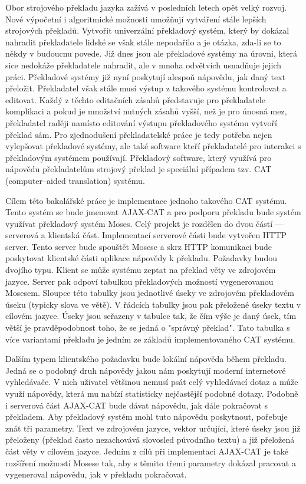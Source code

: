 \documentclass[12pt,a4paper]{report}
\begin{document}
Obor strojového překladu jazyka zažívá v posledních letech opět velký rozvoj. Nové výpočetní i algoritmické možnosti umožňují vytváření stále lepších strojových překladů. Vytvořit univerzální překladový systém, který by dokázal nahradit překladatele lidské se však stále nepodařilo a je otázka, zda-li se to někdy v budoucnu povede. Již dnes jsou ale překladové systémy na úrovni, která sice nedokáže překladatele nahradit, ale v mnoha odvětvích usnadňuje jejich práci. Překladové systémy již nyní poskytují alespoň nápovědu, jak daný text přeložit. Překladatel však stále musí výstup z takového systému kontrolovat a editovat. Každý z těchto editačních zásahů představuje pro překladatele komplikaci a pokud je množství nutných zásahů vyšší, než je pro únosná mez, překladatel raději namísto editování výstupu překladového systému vytvoří překlad sám. Pro zjednodušení překladatelské práce je tedy potřeba nejen vylepšovat překladové systémy, ale také software kteří překladatelé pro interakci s překladovým systémem používají. Překladový software, který využívá pro nápovědu překladatelům strojový překlad je speciální případem tzv. CAT (computer--aided translation) systému.

Cílem této bakalářské práce je implementace jednoho takového CAT systému. Tento systém se bude jmenovat AJAX-CAT a pro podporu překladu bude systém využívat překladový systém Moses. Celý projekt je rozdělen do dvou částí --- serverová a klientská část. Implementací serverové části bude vytvořen HTTP server. Tento server bude spouštět Mosese a skrz HTTP komunikaci bude poskytovat klientské části aplikace nápovědy k překladu. Požadavky budou dvojího typu. Klient se může systému zeptat na překlad věty ve zdrojovém jazyce. Server pak odpoví tabulkou překladových možností vygenerovanou Mosesem. Sloupce této tabulky jsou jednotlivé úseky ve zdrojovém překladovém úseku (typicky slova ve větě). V řádcích tabulky jsou pak přeložené úseky textu v cílovém jazyce. Úseky jsou seřazeny v tabulce tak, že čím výše je daný úsek, tím větší je pravděpodobnost toho, že se jedná o "správný překlad". Tato tabulka s více variantami překladu je jedním ze základů implementovaného CAT systému.

Dalším typem klientského požadavku bude lokální nápověda během překladu. Jedná se o podobný druh nápovědy jakou nám poskytují moderní internetové vyhledávače. V nich uživatel většinou nemusí psát celý vyhledávací dotaz a může využí nápovědy, která mu nabízí statisticky nejčastější podobné dotazy. Podobně i serverová část AJAX-CAT bude dávat nápovědu, jak dále pokračovat s překladem. Aby překladový systém mohl tuto nápovědu poskytnout, pořebuje znát tři parametry. Text ve zdrojovém jazyce, vektor určující, které úseky jsou již přeloženy (překlad často nezachovává slovosled původního textu) a již přeložená část věty v cílovém jazyce. Jedním z cílů při implementaci AJAX-CAT je také rozšíření možností Mosese tak, aby s těmito třemi parametry dokázal pracovat a vygeneroval nápovědu, jak v překladu pokračovat.
\end{document}
